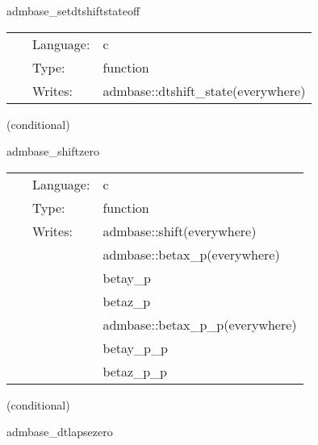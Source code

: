 \documentclass{article}
\begin{document}
\hspace{5mm} admbase\_setdtshiftstateoff 

\hspace{5mm}{\it set the dtshift\_state variable to 0 } 


\hspace{5mm}

 \begin{tabular*}{160mm}{cll} 
~ & Language:  & c \\ 
~ & Type:  & function \\ 
~ & Writes:  & admbase::dtshift\_state(everywhere) \\ 
\end{tabular*} 


\vspace{5mm}

   (conditional) 

\hspace{5mm} admbase\_shiftzero 

\hspace{5mm}{\it set the shift to 0 at all points } 


\hspace{5mm}

 \begin{tabular*}{160mm}{cll} 
~ & Language:  & c \\ 
~ & Type:  & function \\ 
~ & Writes:  & admbase::shift(everywhere) \\ 
~& ~ &admbase::betax\_p(everywhere)\\ 
~& ~ &betay\_p\\ 
~& ~ &betaz\_p\\ 
~& ~ &admbase::betax\_p\_p(everywhere)\\ 
~& ~ &betay\_p\_p\\ 
~& ~ &betaz\_p\_p\\ 
\end{tabular*} 


\vspace{5mm}

   (conditional) 

\hspace{5mm} admbase\_dtlapsezero 

\hspace{5mm}{\it set the dtlapse to 0 at all points } 


\hspace{5mm}
\end{document}
